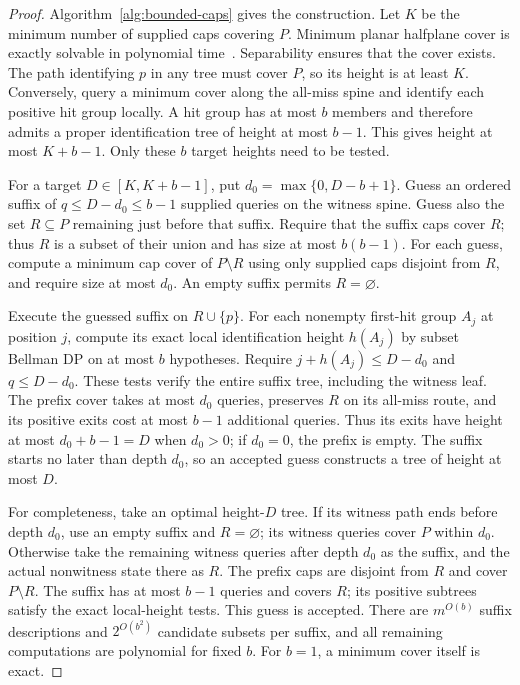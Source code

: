 \begin{proof}
Algorithm~\ref{alg:bounded-caps} gives the construction.
Let $K$ be the minimum number of supplied caps covering $P$.
Minimum planar halfplane cover is exactly solvable in polynomial
time~\cite{harpeledlee2012}. Separability ensures that the cover
exists. The path identifying $p$ in any tree must cover $P$, so
its height is at least $K$. Conversely, query a minimum cover along
the all-miss spine and identify each positive hit group locally.
A hit group has at most $b$ members and therefore admits a proper
identification tree of height at most $b-1$. This gives height at
most $K+b-1$. Only these $b$ target heights need to be tested.

For a target $D\in[K,K+b-1]$, put $d_0=\max\{0,D-b+1\}$.
Guess an ordered suffix of $q\le D-d_0\le b-1$ supplied queries
on the witness spine. Guess also the set $R\subseteq P$ remaining
just before that suffix. Require that the suffix caps cover $R$;
thus $R$ is a subset of their union and has size at most $b(b-1)$.
For each guess, compute a minimum cap cover of $P\setminus R$
using only supplied caps disjoint from $R$, and require size at
most $d_0$. An empty suffix permits $R=\varnothing$.

Execute the guessed suffix on $R\cup\{p\}$. For each nonempty
first-hit group $A_j$ at position $j$, compute its exact local
identification height $h(A_j)$ by subset Bellman DP on at most
$b$ hypotheses. Require $j+h(A_j)\le D-d_0$ and $q\le D-d_0$.
These tests verify the entire suffix tree, including the witness
leaf. The prefix cover takes at most $d_0$ queries, preserves $R$
on its all-miss route, and its positive exits cost at most $b-1$
additional queries. Thus its exits have height at most
$d_0+b-1=D$ when $d_0>0$; if $d_0=0$, the prefix is empty.
The suffix starts no later than depth $d_0$, so an accepted guess
constructs a tree of height at most $D$.

For completeness, take an optimal height-$D$ tree. If its witness
path ends before depth $d_0$, use an empty suffix and $R=\varnothing$;
its witness queries cover $P$ within $d_0$. Otherwise take the
remaining witness queries after depth $d_0$ as the suffix, and the
actual nonwitness state there as $R$. The prefix caps are disjoint
from $R$ and cover $P\setminus R$. The suffix has at most $b-1$
queries and covers $R$; its positive subtrees satisfy the exact
local-height tests. This guess is accepted. There are
$m^{O(b)}$ suffix descriptions and $2^{O(b^2)}$ candidate subsets
per suffix, and all remaining computations are polynomial for
fixed $b$. For $b=1$, a minimum cover itself is exact.
\end{proof}

